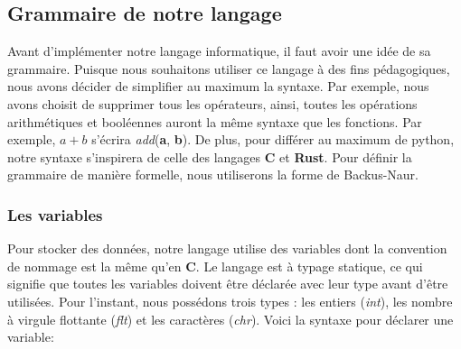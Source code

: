 \documentclass[a4paper]{article}%
\begin{document}
\subsection{Grammaire de notre langage}

Avant d'implémenter notre langage informatique, il faut avoir une idée de sa
grammaire. Puisque nous souhaitons utiliser ce langage à des fins pédagogiques,
nous avons décider de simplifier au maximum la syntaxe. Par exemple, nous avons
choisit de supprimer tous les opérateurs, ainsi, toutes les opérations
arithmétiques et booléennes auront la même syntaxe que les fonctions. Par
exemple, $a+b$ s'écrira \textit{add}(\textbf{a}, \textbf{b}). De plus, pour
différer au maximum de python, notre syntaxe s'inspirera de celle des langages
\textbf{C} et \textbf{Rust}. Pour définir la grammaire de manière formelle, nous
utiliserons la forme de Backus-Naur.


\subsubsection{Les variables}

Pour stocker des données, notre langage utilise des variables dont la
convention de nommage est la même qu'en \textbf{C}. Le langage est à typage
statique, ce qui signifie que toutes les variables doivent être déclarée avec
leur type avant d'être utilisées. Pour l'instant, nous possédons trois types :
les entiers (\textit{int}), les nombre à virgule flottante (\textit{flt}) et les
caractères (\textit{chr}). Voici la syntaxe pour déclarer une variable:
\end{document}
